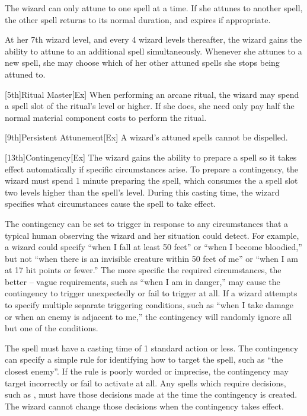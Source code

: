 The wizard can only attune to one spell at a time.
If she attunes to another spell, the other spell returns to its normal duration, and expires if appropriate.

At her 7th wizard level, and every 4 wizard levels thereafter, the wizard gains the ability to attune to an additional spell simultaneously.
Whenever she attunes to a new spell, she may choose which of her other attuned spells she stops being attuned to.

[5th]{Ritual Master}[Ex]
When performing an arcane ritual, the wizard may spend a spell slot of the ritual's level or higher.
If she does, she need only pay half the normal material component costs to perform the ritual.

[9th]{Persistent Attunement}[Ex]
A wizard's attuned spells cannot be dispelled.

[13th]{Contingency}[Ex]
The wizard gains the ability to prepare a spell so it takes effect automatically if specific circumstances arise.
To prepare a contingency, the wizard must spend 1 minute preparing the spell, which consumes the a spell slot two levels higher than the spell's level.
During this casting time, the wizard specifies what circumstances cause the spell to take effect.

The contingency can be set to trigger in response to any circumstances that a typical human observing the wizard and her situation could detect.
For example, a wizard could specify ``when I fall at least 50 feet'' or ``when I become bloodied,'' but not ``when there is an invisible creature within 50 feet of me'' or ``when I am at 17 hit points or fewer.'' The more specific the required circumstances, the better -- vague requirements, such as ``when I am in danger,'' may cause the contingency to trigger unexpectedly or fail to trigger at all.
If a wizard attempts to specify multiple separate triggering conditions, such as ``when I take damage or when an enemy is adjacent to me,'' the contingency will randomly ignore all but one of the conditions.

The spell must have a casting time of 1 standard action or less.
The contingency can specify a simple rule for identifying how to target the spell, such as ``the closest enemy''.
If the rule is poorly worded or imprecise, the contingency may target incorrectly or fail to activate at all.
Any spells which require decisions, such as , must have those decisions made at the time the contingency is created.
The wizard cannot change those decisions when the contingency takes effect.

